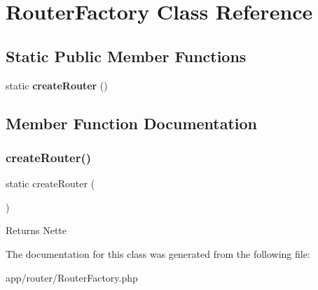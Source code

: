 \section{Router\+Factory Class Reference}
\label{class_app_1_1_router_factory}
\subsection*{Static Public Member Functions}
\begin{DoxyCompactItemize}
\item 
static \textbf{ create\+Router} ()
\end{DoxyCompactItemize}


\subsection{Member Function Documentation}
\mbox{\label{class_app_1_1_router_factory_a3171dc41e4dc8794b661a1a51118d010}} 
\subsubsection{create\+Router()}
{\footnotesize\ttfamily static create\+Router (\begin{DoxyParamCaption}{ }\end{DoxyParamCaption})\hspace{0.3cm}{\ttfamily [static]}}

\begin{DoxyReturn}{Returns}
Nette 
\end{DoxyReturn}


The documentation for this class was generated from the following file\+:\begin{DoxyCompactItemize}
\item 
app/router/Router\+Factory.\+php\end{DoxyCompactItemize}
